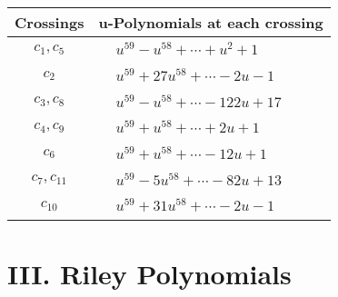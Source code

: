 \documentclass[1p]{elsarticle_modified}
\theoremstyle{definition}
\begin{document}
\begin{tabular}{m{50pt}|m{274pt}}
Crossings & \hspace{64pt}u-Polynomials at each crossing \\
\hline $$\begin{aligned}c_{1},c_{5}\end{aligned}$$&$\begin{aligned}
&u^{59}- u^{58}+\cdots+u^2+1
\end{aligned}$\\
\hline $$\begin{aligned}c_{2}\end{aligned}$$&$\begin{aligned}
&u^{59}+27 u^{58}+\cdots-2 u-1
\end{aligned}$\\
\hline $$\begin{aligned}c_{3},c_{8}\end{aligned}$$&$\begin{aligned}
&u^{59}- u^{58}+\cdots-122 u+17
\end{aligned}$\\
\hline $$\begin{aligned}c_{4},c_{9}\end{aligned}$$&$\begin{aligned}
&u^{59}+u^{58}+\cdots+2 u+1
\end{aligned}$\\
\hline $$\begin{aligned}c_{6}\end{aligned}$$&$\begin{aligned}
&u^{59}+u^{58}+\cdots-12 u+1
\end{aligned}$\\
\hline $$\begin{aligned}c_{7},c_{11}\end{aligned}$$&$\begin{aligned}
&u^{59}-5 u^{58}+\cdots-82 u+13
\end{aligned}$\\
\hline $$\begin{aligned}c_{10}\end{aligned}$$&$\begin{aligned}
&u^{59}+31 u^{58}+\cdots-2 u-1
\end{aligned}$\\
\hline
\end{tabular}\newpage\renewcommand{\arraystretch}{1}
\centering \section*{ III. Riley Polynomials}
\end{document}
